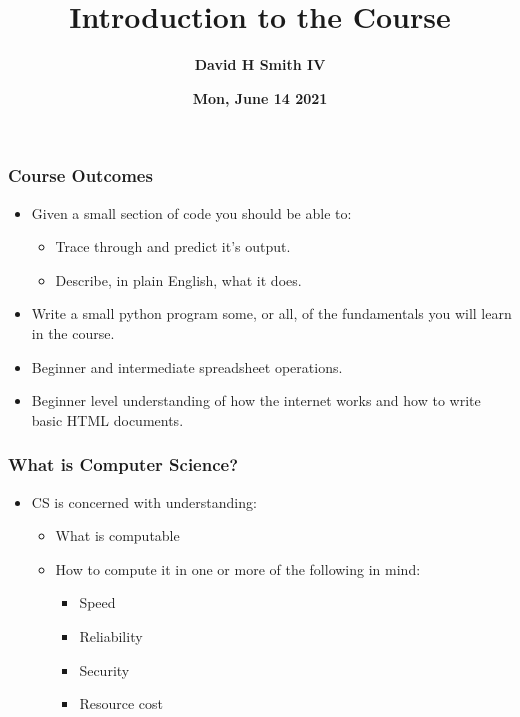\documentclass{beamer}
\title{\textbf{Introduction to the Course}}
\author{\textbf{David H Smith IV}}
\institute[\textbf{UIUC}]{\textbf{University of Illinois Urbana-Champaign}}
\date{\textbf{Mon, June 14 2021}}
\begin{document}
\frame{\titlepage}


%
%
\begin{frame}
  \frametitle{Course Outcomes}
  \begin{itemize}
    \item Given a small section of code you should be able to:
      \begin{itemize}
        \item Trace through and predict it's output.
        \item Describe, in plain English, what it does.
      \end{itemize}
    \item Write a small python program some, or all, of the fundamentals you will learn in the course.
    \item Beginner and intermediate spreadsheet operations.
    \item Beginner level understanding of how the internet works and how to write basic HTML documents.
  \end{itemize}
\end{frame}
%
%
\begin{frame}
  \frametitle{What is Computer Science?}
  \begin{itemize}
    \item CS is concerned with understanding:
      \begin{itemize}
        \pause
        \item What is computable
        \pause
        \item How to compute it in one or more of the following in mind:
          \begin{itemize}
            \pause
            \item Speed
            \pause
            \item Reliability
            \pause
            \item Security 
            \pause
            \item Resource cost
          \end{itemize}
        \pause
      \end{itemize}
  \end{itemize}
\end{frame}
\end{document}
